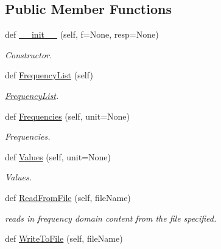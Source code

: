 \subsection*{Public Member Functions}
\begin{DoxyCompactItemize}
\item 
def \hyperlink{classSignalIntegrity_1_1FrequencyDomain_1_1FrequencyDomain_1_1FrequencyDomain_af89c1b84b55a8388acf19c91be67a97e}{\+\_\+\+\_\+init\+\_\+\+\_\+} (self, f=None, resp=None)
\begin{DoxyCompactList}\small\item\em Constructor. \end{DoxyCompactList}\item 
def \hyperlink{classSignalIntegrity_1_1FrequencyDomain_1_1FrequencyDomain_1_1FrequencyDomain_a37f739efb0923d2a962945ab13df78ac}{Frequency\+List} (self)
\begin{DoxyCompactList}\small\item\em \hyperlink{namespaceSignalIntegrity_1_1FrequencyDomain_1_1FrequencyList}{Frequency\+List}. \end{DoxyCompactList}\item 
def \hyperlink{classSignalIntegrity_1_1FrequencyDomain_1_1FrequencyDomain_1_1FrequencyDomain_a227f355ed05bff8c1061e26a8a53758a}{Frequencies} (self, unit=None)
\begin{DoxyCompactList}\small\item\em Frequencies. \end{DoxyCompactList}\item 
def \hyperlink{classSignalIntegrity_1_1FrequencyDomain_1_1FrequencyDomain_1_1FrequencyDomain_a3dc7b1e5eba8fb649156094dfdf7a893}{Values} (self, unit=None)
\begin{DoxyCompactList}\small\item\em Values. \end{DoxyCompactList}\item 
def \hyperlink{classSignalIntegrity_1_1FrequencyDomain_1_1FrequencyDomain_1_1FrequencyDomain_af1bc3f4d93eb8bdf97d312b495a7689d}{Read\+From\+File} (self, file\+Name)
\begin{DoxyCompactList}\small\item\em reads in frequency domain content from the file specified. \end{DoxyCompactList}\item 
def \hyperlink{classSignalIntegrity_1_1FrequencyDomain_1_1FrequencyDomain_1_1FrequencyDomain_a9bc60dff701312ba7ddf47ee941bbc8f}{Write\+To\+File} (self, file\+Name)

\end{DoxyCompactItemize}

